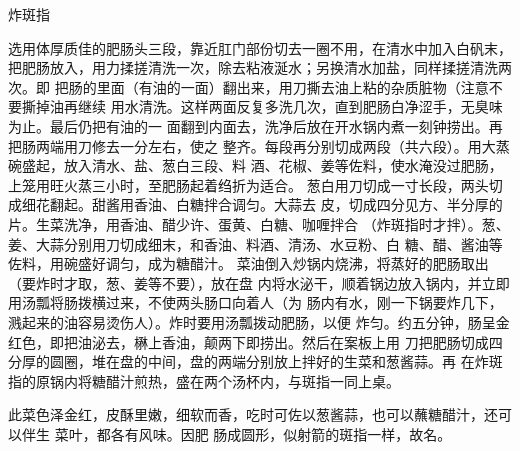 \begin{recipe}{炸斑指}

\ingredients


\cooking

\step 选用体厚质佳的肥肠头三段，靠近肛门部份切去一圈不用，在清水中加入白矾末，
把肥肠放入，用力揉搓清洗一次，除去粘液涎水；另换清水加盐，同样揉搓清洗两次。即
把肠的里面（有油的一面）翻出来，用刀撕去油上粘的杂质脏物（注意不要撕掉油再继续
用水清洗。这样两面反复多洗几次，直到肥肠白净涩手，无臭味为止。最后仍把有油的一
面翻到内面去，洗净后放在开水锅内煮一刻钟捞出。再把肠两端用刀修去一分左右，使之
整齐。每段再分别切成两段（共六段）。用大蒸碗盛起，放入清水、盐、葱白三段、料
酒、花椒、姜等佐料，使水淹没过肥肠，上笼用旺火蒸三小时，至肥肠起着绉折为适合。
\step 葱白用刀切成一寸长段，两头切成细花翻起。甜酱用香油、白糖拌合调匀。大蒜去
皮，切成四分见方、半分厚的片。生菜洗净，用香油、醋少许、蛋黄、白糖、咖喱拌合
（炸斑指时才拌）。葱、姜、大蒜分别用刀切成细末，和香油、料酒、清汤、水豆粉、白
糖、醋、酱油等佐料，用碗盛好调匀，成为糖醋汁。
\step 菜油倒入炒锅内烧沸，将蒸好的肥肠取出（要炸时才取，葱、姜等不要），放在盘
内将水泌干，顺着锅边放入锅内，并立即用汤瓢将肠拨横过来，不使两头肠口向着人（为
肠内有水，刚一下锅要炸几下，溅起来的油容易烫伤人）。炸时要用汤瓢拨动肥肠，以便
炸匀。约五分钟，肠呈金红色，即把油泌去，楙上香油，颠两下即捞出。然后在案板上用
刀把肥肠切成四分厚的圆圈，堆在盘的中间，盘的两端分别放上拌好的生菜和葱酱蒜。再
在炸斑指的原锅内将糖醋汁煎热，盛在两个汤杯内，与斑指一同上桌。

\features

此菜色泽金红，皮酥里嫩，细软而香，吃时可佐以葱酱蒜，也可以蘸糖醋汁，还可以伴生
菜叶，都各有风味。因肥 肠成圆形，似射箭的斑指一样，故名。

\end{recipe}

